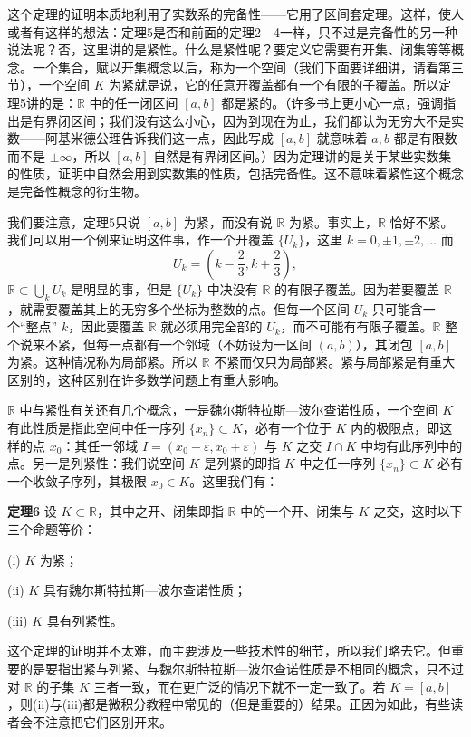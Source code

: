 这个定理的证明本质地利用了实数系的完备性——它用了区间套定理。这样，使人或者有这样的想法：定理5是否和前面的定理2—4一样，只不过是完备性的另一种说法呢？否，这里讲的是紧性。什么是紧性呢？要定义它需要有开集、闭集等等概念。一个集合，赋以开集概念以后，称为一个空间（我们下面要详细讲，请看第三节），一个空间 $K$ 为紧就是说，它的任意开覆盖都有一个有限的子覆盖。所以定理5讲的是：$\mathbb R$ 中的任一闭区间 $[a,b]$ 都是紧的。（许多书上更小心一点，强调指出是有界闭区间；我们没有这么小心，因为到现在为止，我们都认为无穷大不是实数——阿基米德公理告诉我们这一点，因此写成 $[a,b]$ 就意味着 $a,b$ 都是有限数而不是 $\pm\infty$，所以 $[a,b]$ 自然是有界闭区间。）因为定理讲的是关于某些实数集的性质，证明中自然会用到实数集的性质，包括完备性。这不意味着紧性这个概念是完备性概念的衍生物。

我们要注意，定理5只说 $[a,b]$ 为紧，而没有说 $\mathbb R$ 为紧。事实上，$\mathbb R$ 恰好不紧。我们可以用一个例来证明这件事，作一个开覆盖 $\{U_k\}$，这里 $k=0,\pm1,\pm2,\ldots$ 而
\[
 U_k=\left(k-\frac23,k+\frac23\right),
\]
$\mathbb R\subset\bigcup_kU_k$ 是明显的事，但是 $\{U_k\}$ 中决没有 $\mathbb R$ 的有限子覆盖。因为若要覆盖 $\mathbb R$，就需要覆盖其上的无穷多个坐标为整数的点。但每一个区间 $U_k$ 只可能含一个“整点” $k$，因此要覆盖 $\mathbb R$ 就必须用完全部的 $U_k$，而不可能有有限子覆盖。$\mathbb R$ 整个说来不紧，但每一点都有一个邻域（不妨设为一区间 $(a,b)$），其闭包 $[a,b]$ 为紧。这种情况称为局部紧。所以 $\mathbb R$ 不紧而仅只为局部紧。紧与局部紧是有重大区别的，这种区别在许多数学问题上有重大影响。

$\mathbb R$ 中与紧性有关还有几个概念，一是魏尔斯特拉斯—波尔查诺性质，一个空间 $K$ 有此性质是指此空间中任一序列 $\{x_n\}\subset K$，必有一个位于 $K$ 内的极限点，即这样的点 $x_0$：其任一邻域 $I=(x_0-\varepsilon,x_0+\varepsilon)$ 与 $K$ 之交 $I\cap K$ 中均有此序列中的点。另一是列紧性：我们说空间 $K$ 是列紧的即指 $K$ 中之任一序列 $\{x_n\}\subset K$ 必有一个收敛子序列，其极限 $x_0\in K$。这里我们有：

\noindent\textbf{定理6}\quad
设 $K\subset\mathbb R$，其中之开、闭集即指 $\mathbb R$ 中的一个开、闭集与 $K$ 之交，这时以下三个命题等价：

\noindent (i) $K$ 为紧；

\noindent (ii) $K$ 具有魏尔斯特拉斯—波尔查诺性质；

\noindent (iii) $K$ 具有列紧性。

这个定理的证明并不太难，而主要涉及一些技术性的细节，所以我们略去它。但重要的是要指出紧与列紧、与魏尔斯特拉斯—波尔查诺性质是不相同的概念，只不过对 $\mathbb R$ 的子集 $K$ 三者一致，而在更广泛的情况下就不一定一致了。若 $K=[a,b]$，则(ii)与(iii)都是微积分教程中常见的（但是重要的）结果。正因为如此，有些读者会不注意把它们区别开来。

